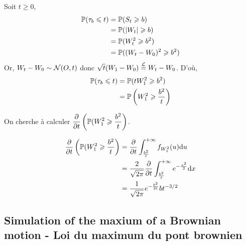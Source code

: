 Soit $t \geq 0$,
\begin{equation*}
\begin{split}
  \P(\tau_b \leq t) &= \P(\st \geq b) \\
  &= \P(\vert \wt \vert \geq b) \\
  &= \P(\wt^2 \geq b^2) \\
  &= \P((\wt-W_0)^2 \geq b^2) 
\end{split}
\end{equation*}
Or, $\wt - W_0 \sim \Normale(O,t)$ donc $\sqrt{t}(W_1 - W_0) \overset{\mathcal{L}}{=} \wt - W_0$.
D'où,
\begin{equation*}
\begin{split}
  \P(\tau_b \leq t) &=  \P(t W_1^2 \geq b^2) \\
  &= \P\left(W_1^2 \geq \frac{b^2}{t}\right)
\end{split}
\end{equation*}

On cherche à calculer $\dps \frac{\partial}{\partial t}\left(\P(W_1^2 \geq \frac{b^2}{t} \right)$.

\begin{equation*}
\begin{split}
  \frac{\partial}{\partial t}\left(\P(W_1^2 \geq \frac{b^2}{t} \right) &= \frac{\partial}{\partial t} \int_{ \frac{b^2}{t}}^{+\infty} f_{W_1^2}(u) \der u \\
  &= \frac{2}{\sqrt{2\pi}} \frac{\partial}{\partial t} \int_{ \frac{b^2}{t}}^{+\infty} e^{- \frac{x^2}{2}} \der x \\
  &= \frac{1}{\sqrt{2\pi}} e^{ - \frac{b^2}{2t}} b t^{-3/2}
\end{split}
\end{equation*}

\subsection{Simulation of the maxium of a Brownian motion - Loi du maximum du pont brownien}
\renewcommand{\ws}{W_s}
\newcommand{\supu}{\sup_{0 \leq s \leq t}}

